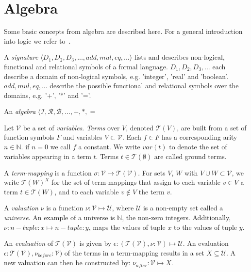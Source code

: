 \section{Algebra}\label{sec:algebra}

Some basic concepts from algebra are described here. For a general introduction into logic we refer to~\cite{Huth:logic}.

A \textit{signature} $\langle D_1, D_2, D_3, ..., add, mul, eq, ...\rangle$ lists and describes non-logical, functional and relational symbols of a formal language. $D_1, D_2, D_3, ...$ each describe a domain of non-logical symbols, e.g. 'integer', 'real' and 'boolean'. $add, mul, eq, ...$ describe the possible functional and relational symbols over the domains, e.g. '+', '*' and '='.

An \textit{algebra} $\langle \mathcal{I}, \mathcal{R}, \mathcal{B}, ..., +, *, =$
 
Let $\mathcal{V}$ be a set of \textit{variables}. \textit{Terms} over $V$, denoted $\mathcal{T}(V)$, are built from a set of function symbols $F$ and variables $V \subset \mathcal{V}$. Each $f\in F$ has a corresponding arity $n\in \mathbb{N}$. if $n = 0$ we call $f$ a constant. We write $var(t)$ to denote the set of variables appearing in a term $t$. Terms $t\in \mathcal{T}(\emptyset)$ are called ground terms.

A \textit{term-mapping} is a function $\sigma:\mathcal{V} \mapsto \mathcal{T}(\mathcal{V})$. For sets $V$, $W$ with $V \cup W \subset \mathcal{V}$, we write $\mathcal{T}(W)^X$ for the set of term-mappings that assign to each variable $v\in V$ a term $t\in \mathcal{T}(W)$, and to each variable $v \not\in V$ the term $v$.

A \textit{valuation} $\nu$ is a function $\nu:\mathcal{V} \mapsto \mathcal{U}$, where $\mathcal{U}$ is a non-empty set called a \textit{universe}. An example of a universe is $\mathbb{N}$, the non-zero integers. Additionally, $\nu:\mathit{n-tuple:x} \mapsto \mathit{n-tuple:y}$, maps the values of tuple $x$ to the values of tuple $y$.

An \textit{evaluation} of $\mathcal{T}(\mathcal{V})$ is given by $\epsilon:(\mathcal{T}(\mathcal{V}),\nu:\mathcal{V}) \mapsto \mathcal{U}$. An evaluation $\epsilon:\mathcal{T}(\mathcal{V}),\nu_\mathit{before}:\mathcal{V})$ of the terms in a term-mapping results in a set $X \subseteq \mathcal{U}$. A new valuation can then be constructed by: $\nu_\mathit{after}:\mathcal{V} \mapsto X$.
